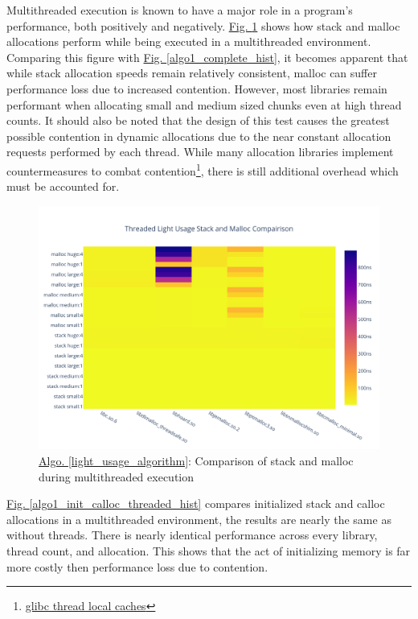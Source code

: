 \documentclass[letterpaper, 10 pt, conference]{ieeeconf}  %
\begin{document}
Multithreaded execution is known to have a major role in a program's performance, both positively and negatively.
\hyperref[algo1_stack_malloc_threaded_hist]{Fig. \ref*{algo1_stack_malloc_threaded_hist}} shows how stack and malloc allocations perform while being executed in a multithreaded environment.
Comparing this figure with \hyperref[algo1_complete_hist]{Fig. \ref*{algo1_complete_hist}}, it becomes apparent that while stack allocation speeds remain relatively consistent, malloc can suffer performance loss due to increased contention.
However, most libraries remain performant when allocating small and medium sized chunks even at high thread counts.
It should also be noted that the design of this test causes the greatest possible contention in dynamic allocations due to the near constant allocation requests performed by each thread. 
While many allocation libraries implement countermeasures to combat contention\footnote{\href{https://sourceware.org/glibc/wiki/MallocInternals\#Thread\_Local\_Cache\_.28tcache.29}{glibc thread local caches}}, there is still additional overhead which must be accounted for.

\begin{figure}[tbh!]
  \centering
  \includegraphics[width=\columnwidth]{graphs/light_stack_malloc_threaded_hist.png}
  \caption{ \hyperref[light_usage_algorithm]{Algo. \ref*{light_usage_algorithm}}: Comparison of stack and malloc during multithreaded execution }
  \label{algo1_stack_malloc_threaded_hist}
\end{figure}

\hyperref[algo1_init_calloc_threaded_hist]{Fig. \ref*{algo1_init_calloc_threaded_hist}} compares initialized stack and calloc allocations in a multithreaded environment, the results are nearly the same as without threads.
There is nearly identical performance across every library, thread count, and allocation.
This shows that  the act of initializing memory is far more costly then performance loss due to contention.
\end{document}
